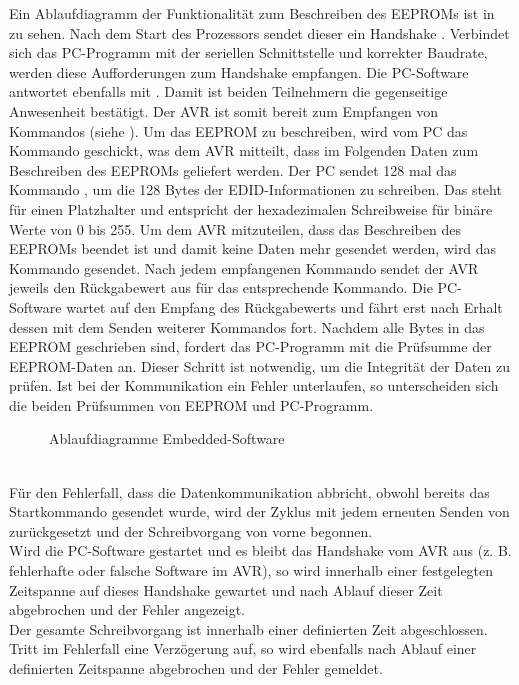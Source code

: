 Ein Ablaufdiagramm der Funktionalität zum Beschreiben des EEPROMs ist in  zu sehen. Nach dem Start des Prozessors sendet dieser ein Handshake . Verbindet sich das PC-Programm mit der seriellen Schnittstelle und korrekter Baudrate, werden diese Aufforderungen zum Handshake empfangen. Die PC-Software antwortet ebenfalls mit . Damit ist beiden Teilnehmern die gegenseitige Anwesenheit bestätigt. Der AVR ist somit bereit zum Empfangen von Kommandos (siehe ). Um das EEPROM zu beschreiben, wird vom PC das Kommando  geschickt, was dem AVR mitteilt, dass im Folgenden Daten zum Beschreiben des EEPROMs geliefert werden. Der PC sendet 128 mal das Kommando , um die 128 Bytes der EDID-Informationen zu schreiben. Das  steht für einen Platzhalter und entspricht der hexadezimalen Schreibweise für binäre Werte von 0 bis 255. Um dem AVR mitzuteilen, dass das Beschreiben des EEPROMs beendet ist und damit keine Daten mehr gesendet werden, wird das Kommando  gesendet. Nach jedem empfangenen Kommando sendet der AVR jeweils den Rückgabewert aus  für das entsprechende Kommando. Die PC-Software wartet auf den Empfang des Rückgabewerts und fährt erst nach Erhalt dessen mit dem Senden weiterer Kommandos fort. Nachdem alle Bytes in das EEPROM geschrieben sind, fordert das PC-Programm mit  die Prüfsumme der EEPROM-Daten an. Dieser Schritt ist notwendig, um die Integrität der Daten zu prüfen. Ist bei der Kommunikation ein Fehler unterlaufen, so unterscheiden sich die beiden Prüfsummen von EEPROM und PC-Programm.\\
\begin{figure}[htp]
	\center
    \caption{Ablaufdiagramme Embedded-Software}
    \label{fig:ablaufdiagramm_avr} 
\end{figure}\\

Für den Fehlerfall, dass die Datenkommunikation abbricht, obwohl bereits das Startkommando  gesendet wurde, wird der Zyklus mit jedem erneuten Senden von  zurückgesetzt und der Schreibvorgang von vorne begonnen.\\
Wird die PC-Software gestartet und es bleibt das Handshake vom AVR aus (z. B. fehlerhafte oder falsche Software im AVR), so wird innerhalb einer festgelegten Zeitspanne auf dieses Handshake gewartet und nach Ablauf dieser Zeit abgebrochen und der Fehler angezeigt.\\
Der gesamte Schreibvorgang ist innerhalb einer definierten Zeit abgeschlossen. Tritt im Fehlerfall eine Verzögerung auf, so wird ebenfalls nach Ablauf einer definierten Zeitspanne abgebrochen und der Fehler gemeldet.
